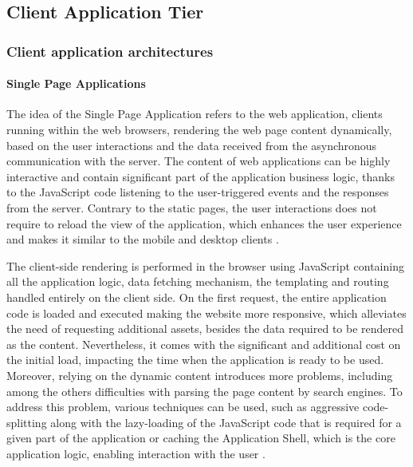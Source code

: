 \subsection{Client Application Tier} \label{chapter:client-application-tier}

\subsubsection{Client application architectures}

\paragraph{Single Page Applications} \label{chapter:client-application-tier-single-page-app}

The idea of the Single Page Application \cite{SPA} refers to the web application, clients running within the web browsers, rendering the web page content dynamically, based on the user interactions and the data received from the asynchronous communication with the server. The content of web applications can be highly interactive and contain significant part of the application business logic, thanks to the JavaScript code listening to the user-triggered events and the responses from the server.
Contrary to the static pages, the user interactions does not require to reload the view of the application, which enhances the user experience and makes it similar to the mobile and desktop clients \cite{PerspectivesOnArchitectureEvolution}.

The client-side rendering is performed in the browser using JavaScript containing all the application logic, data fetching mechanism, the templating and routing handled entirely on the client side. On the first request, the entire application code is loaded and executed making the website more responsive, which alleviates the need of requesting additional assets, besides the data required to be rendered as the content. Nevertheless, it comes with the significant and additional cost on the initial load, impacting the time when the application is ready to be used. Moreover, relying on the dynamic content introduces more problems, including among the others difficulties with parsing the page content by search engines. To address this problem, various techniques can be used, such as aggressive code-splitting along with the lazy-loading of the JavaScript code that is required for a given part of the application or caching the Application Shell, which is the core application logic, enabling interaction with the user \cite{GoogleRenderingOnTheWeb}.

